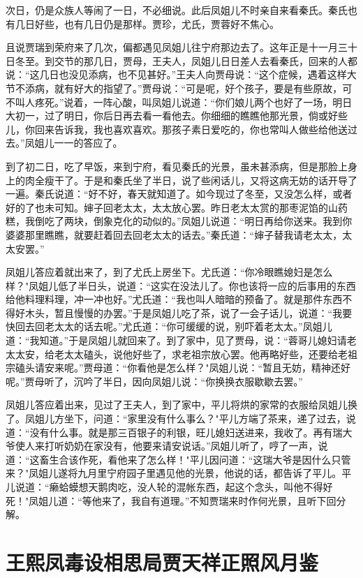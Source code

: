 次日，仍是众族人等闹了一日，不必细说。此后凤姐儿不时亲自来看秦氏。秦氏也有几日好些，也有几日仍是那样。贾珍，尤氏，贾蓉好不焦心。

且说贾瑞到荣府来了几次，偏都遇见凤姐儿往宁府那边去了。这年正是十一月三十日冬至。到交节的那几日，贾母，王夫人，凤姐儿日日差人去看秦氏，回来的人都说：“这几日也没见添病，也不见甚好。”王夫人向贾母说：“这个症候，遇着这样大节不添病，就有好大的指望了。”贾母说：“可是呢，好个孩子，要是有些原故，可不叫人疼死。”说着，一阵心酸，叫凤姐儿说道：“你们娘儿两个也好了一场，明日大初一，过了明日，你后日再去看一看他去。你细细的瞧瞧他那光景，倘或好些儿，你回来告诉我，我也喜欢喜欢。那孩子素日爱吃的，你也常叫人做些给他送过去。”凤姐儿一一的答应了。

到了初二日，吃了早饭，来到宁府，看见秦氏的光景，虽未甚添病，但是那脸上身上的肉全瘦干了。于是和秦氏坐了半日，说了些闲话儿，又将这病无妨的话开导了一遍。秦氏说道：“好不好，春天就知道了。如今现过了冬至，又没怎么样，或者好的了也未可知。婶子回老太太，太太放心罢。昨日老太太赏的那枣泥馅的山药糕，我倒吃了两块，倒象克化的动似的。”凤姐儿说道：“明日再给你送来。我到你婆婆那里瞧瞧，就要赶着回去回老太太的话去。”秦氏道：“婶子替我请老太太，太太安罢。”

凤姐儿答应着就出来了，到了尤氏上房坐下。尤氏道：“你冷眼瞧媳妇是怎么样？"凤姐儿低了半日头，说道：“这实在没法儿了。你也该将一应的后事用的东西给他料理料理，冲一冲也好。”尤氏道：“我也叫人暗暗的预备了。就是那件东西不得好木头，暂且慢慢的办罢。”于是凤姐儿吃了茶，说了一会子话儿，说道：“我要快回去回老太太的话去呢。”尤氏道：“你可缓缓的说，别吓着老太太。”凤姐儿道：“我知道。”于是凤姐儿就回来了。到了家中，见了贾母，说：“蓉哥儿媳妇请老太太安，给老太太磕头，说他好些了，求老祖宗放心罢。他再略好些，还要给老祖宗磕头请安来呢。”贾母道：“你看他是怎么样？"凤姐儿说：“暂且无妨，精神还好呢。”贾母听了，沉吟了半日，因向凤姐儿说：“你换换衣服歇歇去罢。”

凤姐儿答应着出来，见过了王夫人，到了家中，平儿将烘的家常的衣服给凤姐儿换了。凤姐儿方坐下，问道：“家里没有什么事么？"平儿方端了茶来，递了过去，说道：“没有什么事。就是那三百银子的利银，旺儿媳妇送进来，我收了。再有瑞大爷使人来打听奶奶在家没有，他要来请安说话。”凤姐儿听了，哼了一声，说道：“这畜生合该作死，看他来了怎么样！"平儿因问道：“这瑞大爷是因什么只管来？"凤姐儿遂将九月里宁府园子里遇见他的光景，他说的话，都告诉了平儿。平儿说道：“癞蛤蟆想天鹅肉吃，没人轮的混帐东西，起这个念头，叫他不得好死！"凤姐儿道：“等他来了，我自有道理。”不知贾瑞来时作何光景，且听下回分解。

\chapter{王熙凤毒设相思局\ttlbreak 贾天祥正照风月鉴}

